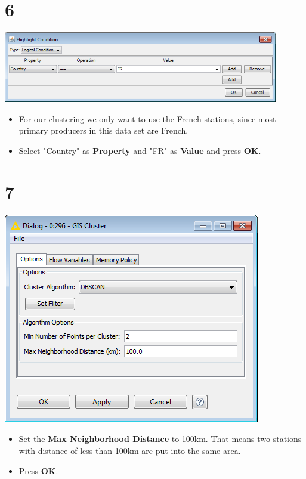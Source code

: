 \documentclass{beamer}
\begin{document}
\section{6}
\begin{frame}
	\begin{center}
  		\includegraphics[width=0.9\textwidth]{6.png}
	\end{center}
	\begin{itemize}
		\item For our clustering we only want to use the French stations, since most primary producers in this data set are French.
		\item Select "Country" as \textbf{Property} and "FR" as \textbf{Value} and press \textbf{OK}.
	\end{itemize}
\end{frame}

\section{7}
\begin{frame}
	\begin{center}
  		\includegraphics[height=0.6\textheight]{7.png}
	\end{center}
	\begin{itemize}
		\item Set the \textbf{Max Neighborhood Distance} to 100km. That means two stations with distance of less than 100km are put into the same area.
		\item Press \textbf{OK}.
	\end{itemize}
\end{frame}
\end{document}
